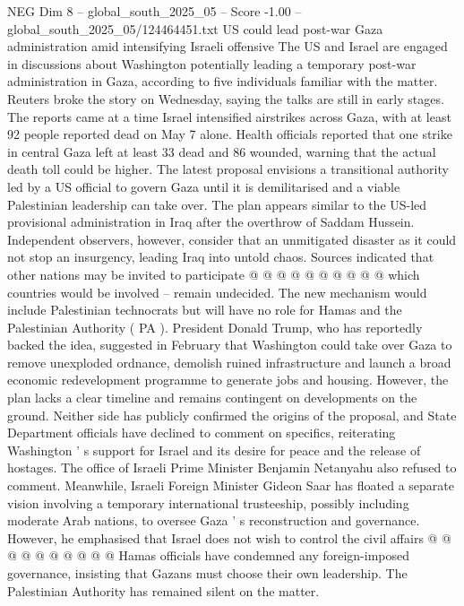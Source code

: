 \begin{textsample}{NEG Dim 8 – global\_south\_2025\_05 – Score -1.00 – global\_south\_2025\_05/124464451.txt}  \label{ex:f8_neg_019}
US could lead post-war Gaza administration amid intensifying Israeli offensive The US and Israel are engaged in discussions about Washington potentially leading a temporary post-war administration in Gaza, according to five individuals familiar with the matter.
Reuters broke the story on Wednesday, saying the talks are still in early stages.
The reports came at a time Israel intensified airstrikes across Gaza, with at least 92 people reported dead on May 7 alone.
Health officials reported that one strike in central Gaza left at least 33 dead and 86 wounded, warning that the actual death toll could be higher.
The latest proposal envisions a transitional authority led by a US official to govern Gaza until it is demilitarised and a viable Palestinian leadership can take over.
The plan appears similar to the US-led provisional administration in Iraq after the overthrow of Saddam Hussein.
Independent observers, however, consider that an unmitigated disaster as it could not stop an insurgency, leading Iraq into untold chaos.
Sources indicated that other nations may be invited to participate @ @ @ @ @ @ @ @ @ @ which countries would be involved -- remain undecided.
The new mechanism would include Palestinian technocrats but will have no role for Hamas and the Palestinian Authority ( PA ).
President Donald Trump, who has reportedly backed the idea, suggested in February that Washington could take over Gaza to remove unexploded ordnance, demolish ruined infrastructure and launch a broad economic redevelopment programme to generate jobs and housing.
However, the plan lacks a clear timeline and remains contingent on developments on the ground.
Neither side has publicly confirmed the origins of the proposal, and State Department officials have declined to comment on specifics, reiterating Washington ' s support for Israel and its desire for peace and the release of hostages.
The office of Israeli Prime Minister Benjamin Netanyahu also refused to comment.
Meanwhile, Israeli Foreign Minister Gideon Saar has floated a separate vision involving a temporary international trusteeship, possibly including moderate Arab nations, to oversee Gaza ' s reconstruction and governance.
However, he emphasised that Israel does not wish to control the civil affairs @ @ @ @ @ @ @ @ @ @ Hamas officials have condemned any foreign-imposed governance, insisting that Gazans must choose their own leadership.
The Palestinian Authority has remained silent on the matter.

\end{textsample}
